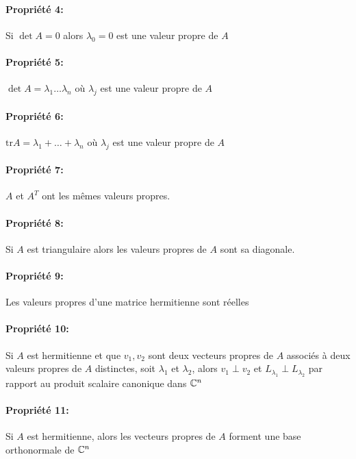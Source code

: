 \paragraph{Propriété 4:} Si $\det A = 0$ alors $\lambda_0 = 0$ est une valeur propre de $A$
\paragraph{Propriété 5:} $\det A = \lambda_1 \dots \lambda_n$ où $\lambda_j$ est une valeur propre de $A$
\paragraph{Propriété 6:} $\text{tr} A = \lambda_1 + \dots + \lambda_n$ où $\lambda_j$ est une valeur propre de $A$
\paragraph{Propriété 7:} $A$ et $A^T$ ont les mêmes valeurs propres.
\paragraph{Propriété 8:} Si $A$ est triangulaire alors les valeurs propres de $A$ sont sa diagonale.
\paragraph{Propriété 9:} Les valeurs propres d'une matrice hermitienne sont réelles
\paragraph{Propriété 10:} Si $A$ est hermitienne et que $v_1, v_2$ sont deux vecteurs propres de
$A$ associés à deux valeurs propres de $A$ distinctes, soit $\lambda_1$ et $\lambda_2$, alors $v_1 \perp v_2$
et $L_{\lambda_1} \perp L_{\lambda_2}$ par rapport au produit scalaire canonique dans $\mathbb{C}^n$
\paragraph{Propriété 11:} \label{property_11} Si $A$ est hermitienne, alors les vecteurs propres de $A$ forment une base orthonormale de $\mathbb{C}^n$

